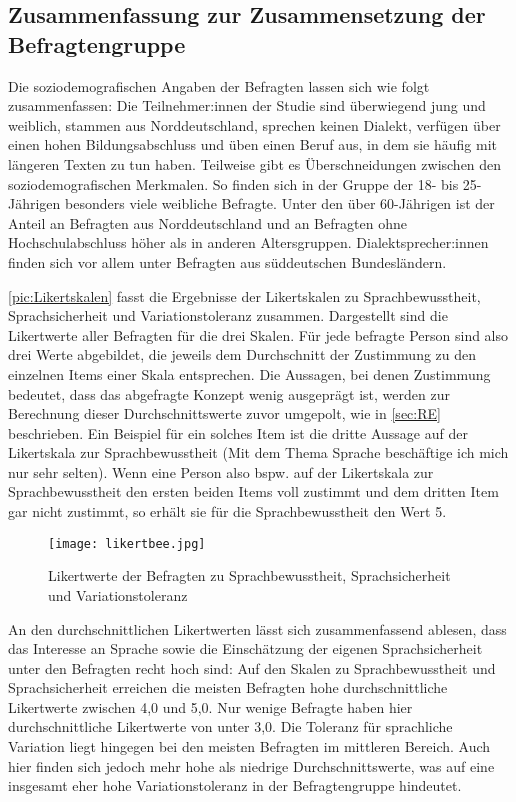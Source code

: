 \subsection{Zusammenfassung zur Zusammensetzung der Befragtengruppe}
\label{sec:ZsfsgBefragte}
Die soziodemografischen Angaben der Befragten lassen sich wie folgt zusammenfassen:
Die Teilnehmer:innen der Studie sind überwiegend jung und weiblich, stammen aus Norddeutschland, sprechen keinen Dialekt, verfügen über einen hohen Bildungsabschluss und üben einen Beruf aus, in dem sie häufig mit längeren Texten zu tun haben.
Teilweise gibt es Überschneidungen zwischen den soziodemografischen Merkmalen. 
So finden sich in der Gruppe der 18- bis 25-Jährigen besonders viele weibliche Befragte. 
Unter den über 60-Jährigen ist der Anteil an Befragten aus Norddeutschland und an Befragten ohne Hochschulabschluss höher als in anderen Altersgruppen. 
Dialektsprecher:innen finden sich vor allem unter Befragten aus süddeutschen Bundesländern. 

\begin{sloppypar}
\autoref{pic:Likertskalen} fasst die Ergebnisse der Likertskalen zu Sprachbewusstheit, Sprachsicherheit und Variationstoleranz zusammen. 
Dargestellt sind die Likertwerte aller Befragten für die drei Skalen. 
Für jede befragte Person sind also drei Werte abgebildet, die jeweils  dem Durchschnitt der Zustimmung zu den einzelnen Items einer Skala entsprechen.
Die Aussagen, bei denen Zustimmung bedeutet, dass das abgefragte Konzept wenig ausgeprägt ist, werden zur Berechnung dieser Durchschnittswerte zuvor umgepolt, wie  in \autoref{sec:RE} beschrieben. 
Ein Beispiel für ein solches Item ist die dritte Aussage auf der Likertskala zur Sprachbewusstheit (\glqq Mit dem Thema Sprache beschäftige ich mich nur sehr selten\grqq).
Wenn eine Person also bspw. auf der Likertskala zur Sprachbewusstheit den ersten beiden Items voll zustimmt und dem dritten Item gar nicht zustimmt, so erhält sie für die Sprachbewusstheit den Wert 5. 
\end{sloppypar}

\begin{figure}
\centering
\texttt{[image: likertbee.jpg]}
\caption{Likertwerte der Befragten zu Sprachbewusstheit, Sprachsicherheit und Variationstoleranz}
\label{pic:Likertskalen}
\end{figure}
 
An den durchschnittlichen Likertwerten lässt sich zusammenfassend ablesen, dass das Interesse an Sprache sowie die Einschätzung der eigenen Sprachsicherheit unter den Befragten recht hoch sind:
Auf den Skalen zu Sprachbewusstheit und Sprachsicherheit erreichen die meisten Befragten hohe durchschnittliche Likertwerte zwischen 4,0 und 5,0. 
Nur wenige Befragte haben hier durchschnittliche Likertwerte von unter 3,0. 
Die Toleranz für sprachliche Variation liegt hingegen bei den meisten Befragten im mittleren Bereich. 
Auch hier finden sich jedoch mehr hohe als niedrige Durchschnittswerte, was auf eine insgesamt eher hohe Variationstoleranz in der Befragtengruppe hindeutet.  
